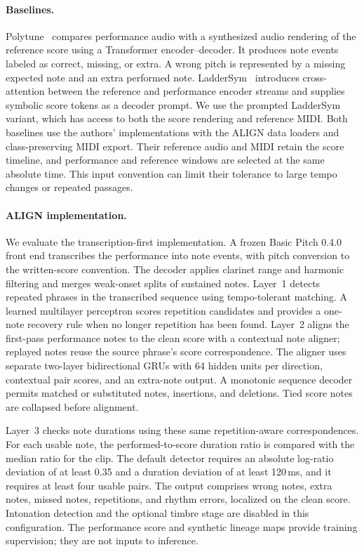 \paragraph{Baselines.}
Polytune~\cite{chou2025polytune} compares performance audio with a synthesized
audio rendering of the reference score using a Transformer encoder--decoder.
It produces note events labeled as correct, missing, or extra. A wrong pitch
is represented by a missing expected note and an extra performed note.
LadderSym~\cite{chou2026laddersym} introduces cross-attention between the
reference and performance encoder streams and supplies symbolic score
tokens as a decoder prompt. We use the prompted LadderSym variant, which
has access to both the score rendering and reference MIDI. Both baselines
use the authors' implementations with the ALIGN data loaders and
class-preserving MIDI export. Their reference audio and MIDI retain the
score timeline, and performance and reference windows are selected at the
same absolute time. This input convention can limit their tolerance to
large tempo changes or repeated passages.

\paragraph{ALIGN implementation.}
We evaluate the transcription-first implementation. A frozen Basic Pitch
0.4.0 front end transcribes the performance into note events, with pitch
conversion to the written-score convention. The decoder applies clarinet
range and harmonic filtering and merges weak-onset splits of sustained
notes. Layer~1 detects repeated phrases in the transcribed sequence using
tempo-tolerant matching. A learned multilayer perceptron scores repetition
candidates and provides a one-note recovery rule when no longer repetition
has been found. Layer~2 aligns the first-pass performance notes to the clean
score with a contextual note aligner; replayed notes reuse the source
phrase's score correspondence. The aligner uses separate two-layer
bidirectional GRUs with 64 hidden units per direction, contextual pair
scores, and an extra-note output. A monotonic sequence decoder permits
matched or substituted notes, insertions, and deletions. Tied score notes
are collapsed before alignment.

Layer~3 checks note durations using these same repetition-aware
correspondences. For each usable note, the performed-to-score duration
ratio is compared with the median ratio for the clip. The default detector
requires an absolute log-ratio deviation of at least 0.35 and a duration
deviation of at least 120\,ms, and it requires at least four usable pairs.
The output comprises wrong notes, extra notes, missed notes, repetitions,
and rhythm errors, localized on the clean score. Intonation detection and
the optional timbre stage are disabled in this configuration. The
performance score and synthetic lineage maps provide training supervision;
they are not inputs to inference.

